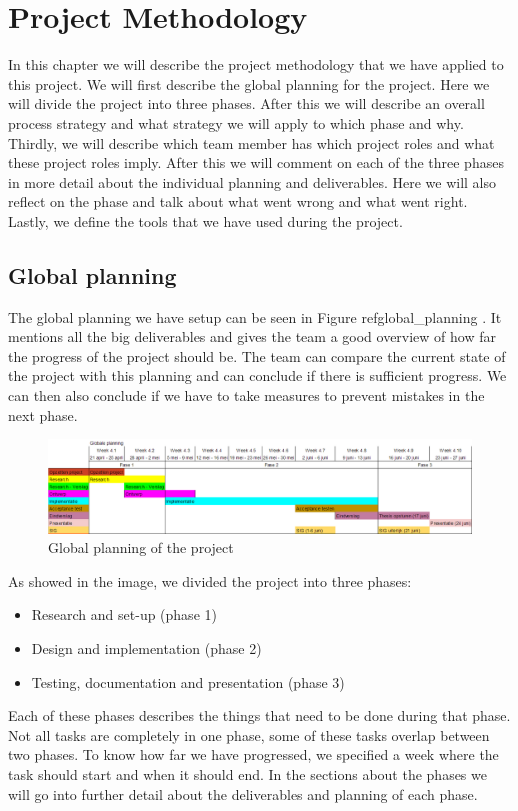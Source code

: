 \chapter{Project Methodology}
\label{sec:methodology}
In this chapter we will describe the project methodology that we have applied to this project.
We will first describe the global planning for the project.
Here we will divide the project into three phases.
After this we will describe an overall process strategy and what strategy we will apply to which phase and why.
Thirdly, we will describe which team member has which project roles and what these project roles imply.
After this we will comment on each of the three phases in more detail about the individual planning and deliverables.
Here we will also reflect on the phase and talk about what went wrong and what went right.
Lastly, we define the tools that we have used during the project.

\section{Global planning}
The global planning we have setup can be seen in Figure ref{global_planning} .
It mentions all the big deliverables and gives the team a good overview of how far the progress of the project should be.
The team can compare the current state of the project with this planning and can conclude if there is sufficient progress.
We can then also conclude if we have to take measures to prevent mistakes in the next phase.

\begin{figure}[h]
    \centering
    \includegraphics[width=\textwidth]{images/Global_planning}
    \caption{Global planning of the project}
    \label{global_planning}
\end{figure}

As showed in the image, we divided the project into three phases:
\begin{itemize}
\item Research and set-up (phase 1)
\item Design and implementation (phase 2)
\item Testing, documentation and presentation (phase 3)
\end{itemize}
Each of these phases describes the things that need to be done during that phase.
Not all tasks are completely in one phase, some of these tasks overlap between two phases.
To know how far we have progressed, we specified a week where the task should start and when it should end.
In the sections about the phases we will go into further detail about the deliverables and planning of each phase.

